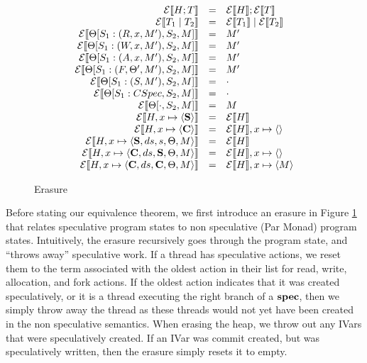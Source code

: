 \begin{figure}[]
\begin{displaymath}
\begin{array}{rcll}
\mathcal{E}\llbracket H; T \rrbracket &=& \mathcal{E}\llbracket H \rrbracket; \mathcal{E}\llbracket T\rrbracket \\
\mathcal{E}\llbracket T_1 \; | \; T_2\rrbracket &=& \mathcal{E}\llbracket T_1\rrbracket \; | \; \mathcal{E}\llbracket T_2\rrbracket \\
\mathcal{E}\llbracket \Theta[S_1 : (R, x, M'), S_2, M]\rrbracket &=& M' \\
\mathcal{E}\llbracket \Theta[S_1 : (W, x, M'), S_2, M]\rrbracket &=& M' \\
\mathcal{E}\llbracket \Theta[S_1 : (A, x, M'), S_2, M]\rrbracket &=& M' \\
\mathcal{E}\llbracket \Theta[S_1 : (F, \Theta', M'), S_2, M]\rrbracket &=& M' \\
\mathcal{E}\llbracket \Theta[S_1 : (S, M'), S_2, M]\rrbracket&=& \cdot \\
\mathcal{E}\llbracket \Theta[S_1 : CSpec, S_2, M]\rrbracket &=& \cdot \\
\mathcal{E}\llbracket \Theta[\cdot, S_2, M]\rrbracket &=& M \\
\mathcal{E}\llbracket H, x \mapsto \langle \text{\bf S} \rangle \rrbracket &=& \mathcal{E}\llbracket H \rrbracket \\
\mathcal{E}\llbracket H, x \mapsto \langle \text{\bf C} \rangle \rrbracket &=& \mathcal{E}\llbracket H \rrbracket, x\mapsto \langle\rangle \\
\mathcal{E}\llbracket H, x \mapsto \langle \text{\bf S}, ds, s, \Theta, M\rangle \rrbracket &=& \mathcal{E}\llbracket H \rrbracket \\
\mathcal{E}\llbracket H, x\mapsto \langle \text{\bf C}, ds, \text{\bf S}, \Theta, M\rangle \rrbracket &=& \mathcal{E}\llbracket H \rrbracket, x \mapsto \langle\rangle \\
\mathcal{E}\llbracket H, x \mapsto \langle \text{\bf C}, ds, \text{\bf C}, \Theta, M\rangle \rrbracket &=& \mathcal{E}\llbracket H \rrbracket, x \mapsto \langle M\rangle \\
\end{array}
\end{displaymath}
\caption{Erasure}
\label{fig:erasure}
\end{figure}

Before stating our equivalence theorem, we first introduce an erasure in Figure \ref{fig:erasure} that relates speculative program states to non speculative (Par Monad) program states.  Intuitively, the erasure recursively goes through the program state, and ``throws away'' speculative work.  If a thread has speculative actions, we reset them to the term associated with the oldest action in their list for read, write, allocation, and fork actions.  If the oldest action indicates that it was created speculatively, or it is a thread executing the right branch of a $\text{\bf spec}$, then we simply throw away the thread as these threads would not yet have been created in the non speculative semantics.  When erasing the heap, we throw out any IVars that were speculatively created.  If an IVar was commit created, but was speculatively written, then the erasure simply resets it to empty.  

